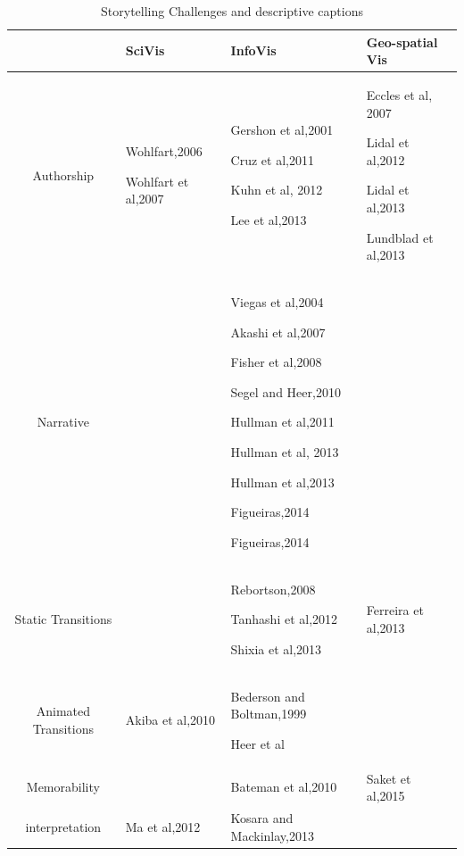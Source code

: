 \documentclass{egpubl}
\begin{document}
\begin{table}[htbp]
\centering
\caption{Storytelling Challenges and descriptive captions} 
\centering 
\begin{tabular}{|c| p{4cm}| p{5cm}|p{4cm}|} 
\hline
 & SciVis & InfoVis & Geo-spatial Vis\\ 
\hline
Authorship & Wohlfart,2006 \cite{wohlfat}\par Wohlfart et al,2007\cite{wohlfart2} \par & Gershon et al,2001\cite{Gershon2}\par Cruz et al,2011 \cite{cruz2011} \par Kuhn et al, 2012\cite{kuhn2012} \par  Lee et al,2013\cite{lee2013} \par & Eccles et al, 2007\cite{eccles2007} \par  Lidal et al,2012 \cite{lidal}  \par Lidal et al,2013\cite{Lidal2013} \par Lundblad et al,2013\cite{lundblad2013} \par\\
\hline 
Narrative & & Viegas et al,2004\cite{viegas2004}\par Akashi et al,2007\cite{akaishi2007narrative} \par Fisher et al,2008\cite{fisher} \par Segel and Heer,2010\cite{segal}\par  Hullman et al,2011\cite{hullman} \par Hullman et al, 2013 \cite{hullman2013} \par Hullman et al,2013 \cite{hullman2013deeper} \par Figueiras,2014 \cite{figueiras} \par Figueiras,2014 \cite{figueiras2014tell}&\\ 
\hline
Static Transitions & & Rebortson,2008\cite{Rebortson} \par  Tanhashi et al,2012\cite{Tanahashi} \par Shixia et al,2013\cite{shixia} & Ferreira et al,2013\cite{ferreira2013} \par \\ 
\hline
Animated Transitions & Akiba et al,2010\cite{Akiba} \par & Bederson and Boltman,1999\cite{bedrson}\par Heer et al \cite{heer2007} \par &\\
\hline
Memorability & &  Bateman et al,2010\cite{bateman} \par & Saket et al,2015 \cite{saket2015} \par\\ 
\hline
interpretation &  Ma et al,2012\cite{sci} \par  &  Kosara and Mackinlay,2013\cite{Kosara} \par & \\
\hline
\end{tabular}
\label{table:classification1} 
\end{table}
\end{document}
